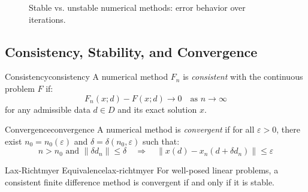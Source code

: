 \begin{figure}[ht]
    \centering
    \caption{Stable vs. unstable numerical methods: error behavior over iterations.}
    \label{fig:stability}
\end{figure}

\subsection{Consistency, Stability, and Convergence}
\label{subsec:consistency}

\begin{definition}{Consistency}{consistency}
    A numerical method $F_n$ is \emph{consistent} with the continuous problem $F$ if:
    \[
        F_n(x; d) - F(x; d) \to 0 \quad \text{as } n \to \infty
    \]
    for any admissible data $d \in D$ and its exact solution $x$.
\end{definition}

\begin{definition}{Convergence}{convergence}
    A numerical method is \emph{convergent} if for all $\varepsilon > 0$, there exist $n_0 = n_0(\varepsilon)$ and $\delta = \delta(n_0, \varepsilon)$ such that:
    \[
        n > n_0 \text{ and } \|\delta d_n\| \leq \delta \quad \Rightarrow \quad \|x(d) - x_n(d + \delta d_n)\| \leq \varepsilon
    \]
\end{definition}
\begin{theorem}{Lax-Richtmyer Equivalence}{lax-richtmyer}
    For well-posed linear problems, a consistent finite difference method is convergent if and only if it is stable.
\end{theorem}

